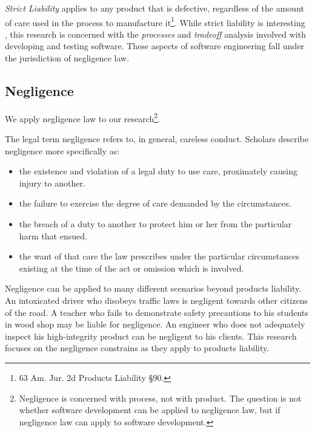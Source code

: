 \textit{Strict Liability} applies to any product that is defective, regardless
of the amount of care used in the process to manufacture it\footnote{63 Am. Jur.
2d Products Liability \S 90.}. While strict liability is interesting
\cite{Turner00}, this research is concerned with the \textit{processes} and
\textit{tradeoff} analysis involved with developing and testing software. These
aspects of software engineering fall under the jurisdiction of negligence law.

\subsection{Negligence}\label{SS:Negligence}
We apply negligence law to our research\footnote{Negligence is 
concerned with process, not with product. The question is not whether software 
development can be applied to negligence law, but if negligence law can apply to
software development.}.

The legal term negligence refers to, in general, careless conduct. Scholars
describe negligence more specifically as:

\singlespace
\begin{itemize}
 \item the existence and violation of a legal duty to use care, proximately 
 causing injury to another.
 \item the failure to exercise the degree of care demanded by the circumstances.
 \item the breach of a duty to another to protect him or her from the particular
 harm that ensued.
 \item the want of that care the law prescribes under the particular
 circumstances existing at the time of the act or omission which is involved.
\end{itemize}
\doublespace

Negligence can be applied to many different scenarios beyond products
liability. An intoxicated driver who disobeys traffic laws is negligent towards
other citizens of the road. A teacher who fails to demonstrate safety
precautions to his students in wood shop may be liable for negligence. An
engineer who does not adequately inspect his high-integrity product can be
negligent to his clients. This research focuses on the negligence constrains as
they apply to products liability.

